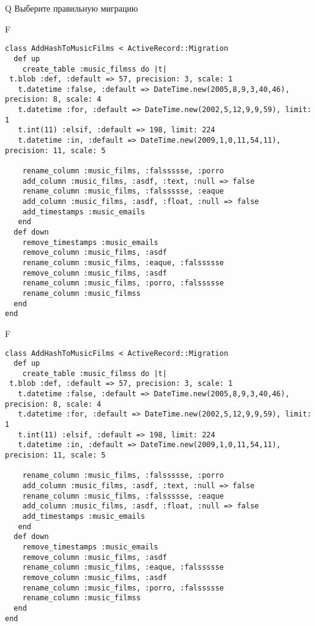 Q
Выберите правильную миграцию

F
\begin{verbatim}
class AddHashToMusicFilms < ActiveRecord::Migration
  def up
    create_table :music_filmss do |t| 
 t.blob :def, :default => 57, precision: 3, scale: 1
   t.datetime :false, :default => DateTime.new(2005,8,9,3,40,46), precision: 8, scale: 4
   t.datetime :for, :default => DateTime.new(2002,5,12,9,9,59), limit: 1
   t.int(11) :elsif, :default => 198, limit: 224
   t.datetime :in, :default => DateTime.new(2009,1,0,11,54,11), precision: 11, scale: 5

    rename_column :music_films, :falssssse, :porro
    add_column :music_films, :asdf, :text, :null => false
    rename_column :music_films, :falssssse, :eaque
    add_column :music_films, :asdf, :float, :null => false
    add_timestamps :music_emails
   end
  def down
    remove_timestamps :music_emails
    remove_column :music_films, :asdf
    rename_column :music_films, :eaque, :falssssse
    remove_column :music_films, :asdf
    rename_column :music_films, :porro, :falssssse
    rename_column :music_filmss
  end
end
\end{verbatim}

F
\begin{verbatim}
class AddHashToMusicFilms < ActiveRecord::Migration
  def up
    create_table :music_filmss do |t| 
 t.blob :def, :default => 57, precision: 3, scale: 1
   t.datetime :false, :default => DateTime.new(2005,8,9,3,40,46), precision: 8, scale: 4
   t.datetime :for, :default => DateTime.new(2002,5,12,9,9,59), limit: 1
   t.int(11) :elsif, :default => 198, limit: 224
   t.datetime :in, :default => DateTime.new(2009,1,0,11,54,11), precision: 11, scale: 5

    rename_column :music_films, :falssssse, :porro
    add_column :music_films, :asdf, :text, :null => false
    rename_column :music_films, :falssssse, :eaque
    add_column :music_films, :asdf, :float, :null => false
    add_timestamps :music_emails
   end
  def down
    remove_timestamps :music_emails
    remove_column :music_films, :asdf
    rename_column :music_films, :eaque, :falssssse
    remove_column :music_films, :asdf
    rename_column :music_films, :porro, :falssssse
    rename_column :music_filmss
  end
end
\end{verbatim}

